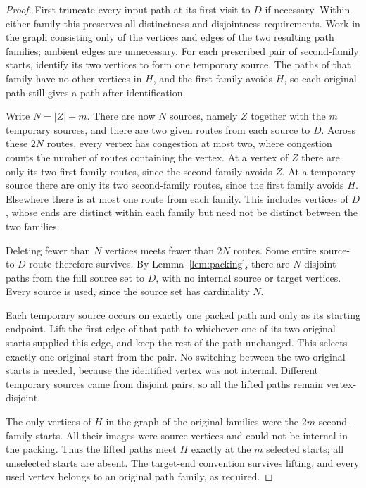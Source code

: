 \begin{proof}
First truncate every input path at its first visit to $D$ if necessary.
Within either family this preserves all distinctness and disjointness
requirements.  Work in the graph consisting only of the vertices and
edges of the two resulting path families; ambient edges are unnecessary.
For each prescribed pair of second-family starts, identify its two
vertices to form one temporary source.  The paths of that family have
no other vertices in $H$, and the first family avoids $H$, so each
original path still gives a path after identification.

Write $N=|Z|+m$.  There are now $N$ sources, namely $Z$ together with
the $m$ temporary sources, and there are two given routes from each
source to $D$.  Across these $2N$ routes, every vertex has congestion
at most two, where congestion counts the number of routes containing
the vertex.  At a vertex of $Z$ there are only its two first-family
routes, since the second family avoids $Z$.  At a temporary source
there are only its two second-family routes, since the first family
avoids $H$.  Elsewhere there is at most one route from each family.
This includes vertices of $D$, whose ends are distinct within each
family but need not be distinct between the two families.

Deleting fewer than $N$ vertices meets fewer than $2N$ routes.
Some entire source-to-$D$ route therefore survives.  By
Lemma~\ref{lem:packing}, there are $N$ disjoint paths from the full
source set to $D$, with no internal source or target vertices.
Every source is used, since the source set has cardinality $N$.

Each temporary source occurs on exactly one packed path and only as
its starting endpoint.  Lift the first edge of that path to whichever
one of its two original starts supplied this edge, and keep the rest
of the path unchanged.  This selects exactly one original start from
the pair.  No switching between the two original starts is needed,
because the identified vertex was not internal.  Different temporary
sources came from disjoint pairs, so all the lifted paths remain
vertex-disjoint.

The only vertices of $H$ in the graph of the original families were
the $2m$ second-family starts.  All their images were source vertices
and could not be internal in the packing.  Thus the lifted paths meet
$H$ exactly at the $m$ selected starts; all unselected starts are
absent.  The target-end convention survives lifting, and every used
vertex belongs to an original path family, as required.
\end{proof}
